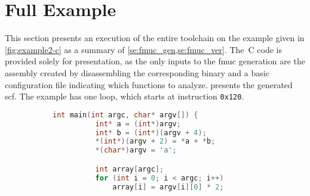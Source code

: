 \section{Full Example}\label{se:syntax_example}
This section presents an execution of the entire toolchain
on the example given in \cref{fig:example2-c}
as a summary of \cref{se:fmuc_gen,se:fmuc_ver}.
The~C code is provided solely for presentation,
as the only inputs to the \ac{fmuc} generation
are the assembly created by disassembling the corresponding binary%
%
%
and a basic configuration file indicating which functions to analyze.
 presents the generated \ac{scf}.
The example has one loop, which starts at instruction \texttt{0x120}.%
\begin{figure}
  \begin{subfigure}[b]{.53\linewidth}
    \begin{lstlisting}[language=C, gobble=6]
      int main(int argc, char* argv[]) {
          int* a = (int*)argv;
          int* b = (int*)(argv + 4);
          *(int*)(argv + 2) = *a + *b;
          *(char*)argv = 'a';

          int array[argc];
          for (int i = 0; i < argc; i++)
              array[i] = argv[i][0] * 2;


\end{lstlisting}
\end{subfigure}
\end{figure}

